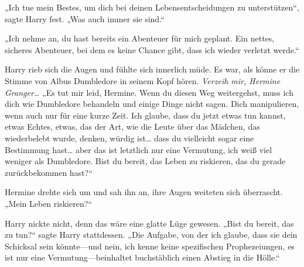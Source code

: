 „Ich tue mein Bestes, um dich bei deinen Lebensentscheidungen zu unterstützen“, sagte Harry fest. „Was auch immer sie sind.“

„Ich nehme an, du hast bereits ein Abenteuer für mich geplant. Ein nettes, sicheres Abenteuer, bei dem es keine Chance gibt, dass ich wieder verletzt werde.“

Harry rieb sich die Augen und fühlte sich innerlich müde. Es war, als könne er die Stimme von Albus Dumbledore in seinem Kopf hören.
\emph{Verzeih mir, Hermine Granger…}
„Es tut mir leid, Hermine. Wenn du diesen Weg weitergehst, muss ich dich wie Dumbledore behandeln und einige Dinge nicht sagen. Dich manipulieren, wenn auch nur für eine kurze Zeit. Ich glaube, dass du jetzt etwas tun kannst, etwas Echtes, etwas, das der Art, wie die Leute über das Mädchen, das wiederbelebt wurde, denken, würdig ist… dass du vielleicht sogar eine Bestimmung hast… aber das ist letztlich nur eine Vermutung, ich weiß viel weniger als Dumbledore. Bist du bereit, das Leben zu riskieren, das du gerade zurückbekommen hast?“

Hermine drehte sich um und sah ihn an, ihre Augen weiteten sich überrascht. „Mein Leben riskieren?“

Harry nickte nicht, denn das wäre eine glatte Lüge gewesen.
„Bist du bereit, das zu tun?“ sagte Harry stattdessen. „Die Aufgabe, von der ich glaube, dass sie dein Schicksal sein könnte—und nein, ich kenne keine spezifischen Prophezeiungen, es ist nur eine Vermutung—beinhaltet buchstäblich einen Abstieg in die Hölle.“

